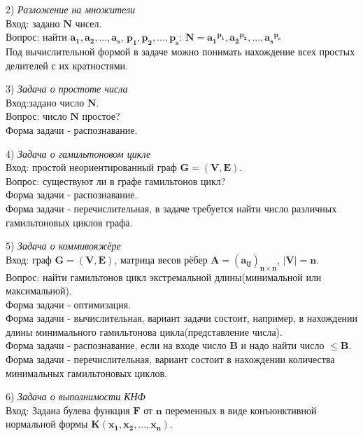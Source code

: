     \par 2) \textit{Разложение на множители}
    \\
    Вход: задано $\boldsymbol{N}$ чисел. \\
    Вопрос: найти $\boldsymbol{a_1, a_2, ... , a_s}$, $\boldsymbol{p_1, p_2, ... , p_s}$: $\boldsymbol{N = {a_1}^{p_1}, {a_2}^{p_2}, ... , {a_s}^{p_s} }$\\
    Под вычислительной формой в задаче можно понимать нахождение всех простых делителей с их кратностями.
    \par 3) \textit{Задача о простоте числа} \\
    Вход:задано число $\boldsymbol{N}$.\\
    Вопрос: число $\boldsymbol{N}$ простое? \\
    Форма задачи - распознавание.
    \par 4) \textit{Задача о гамильтоновом цикле} \\
    Вход: простой неориентированный граф $\boldsymbol{G = (V, E)}$.\\
    Вопрос: существуют ли в графе гамильтонов цикл?\\
    Форма задачи - распознавание.\\
    Форма задачи - перечислительная, в задаче требуется найти число различных гамильтоновых циклов графа.
    \par 5) \textit{Задача о коммивояжёре} \\
    Вход: граф $\boldsymbol{G = (V, E)}$, матрица весов рёбер $\boldsymbol{A = {(a_{ij})}_{n\times n}}$, $\boldsymbol{|V| = n}$. \\
    Вопрос: найти гамильтонов цикл экстремальной длины(минимальной или максимальной).\\
    Форма задачи - оптимизация. \\
    Форма задачи - вычислительная, вариант задачи состоит, например, в нахождении длины минимального гамильтонова цикла(представление числа).\\ 
    Форма задачи - распознавание, если на входе число $\boldsymbol{B}$ и надо найти число $\boldsymbol{\le B}$.\\
    Форма задачи - перечислительная, вариант состоит в нахождении количества минимальных гамильтоновых циклов.
    \par 6) \textit{Задача о выполнимости КНФ} \\
    Вход: Задана булева функция $\boldsymbol{F}$ от $\boldsymbol{n}$ переменных в виде конъюнктивной нормальной формы $\boldsymbol{K(x_1, x_2, ... , x_n)}$.  \\
